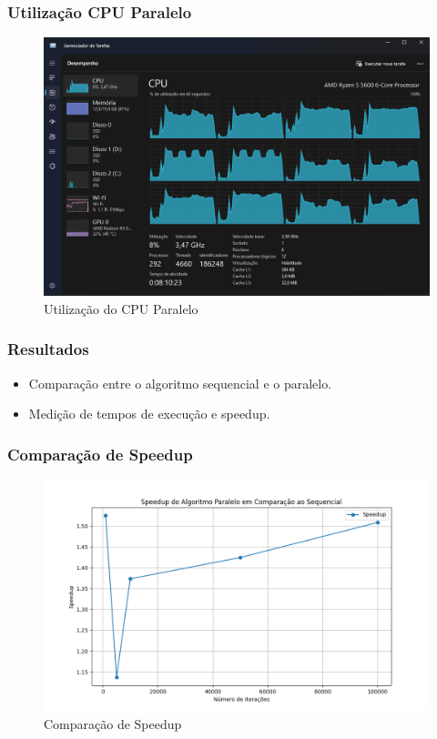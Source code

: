 \documentclass{beamer}
\begin{document}
	\begin{frame}
		\frametitle{Utilização CPU Paralelo}
		\begin{figure}
			\centering
			\includegraphics[width=.8\linewidth]{CPU Paralelo.png} %
			\caption{Utilização do CPU Paralelo}
		\end{figure}
	\end{frame}
	
	\begin{frame}
		\frametitle{Resultados}
		\begin{itemize}
			\item Comparação entre o algoritmo sequencial e o paralelo.
			\item Medição de tempos de execução e speedup.
		\end{itemize}
	\end{frame}
	
	\begin{frame}
		\frametitle{Comparação de Speedup}
		\begin{figure}
			\centering
			\includegraphics[width=1\linewidth]{speedup.png} %
			\caption{Comparação de Speedup}
		\end{figure}
	\end{frame}
	
\end{document}
